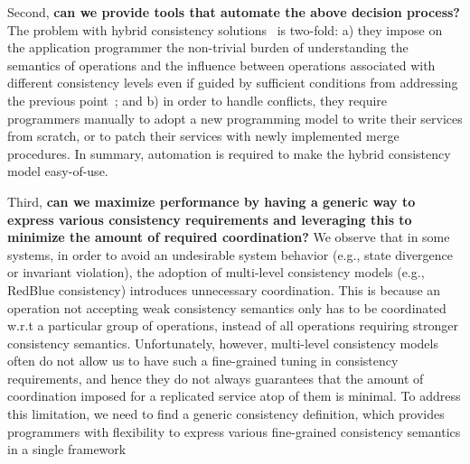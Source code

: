 Second, \textbf{can we provide tools that automate the above 
decision process?} The problem
 with hybrid consistency solutions~\cite{Ladin1992LazyReplication, 
Singh2009Zeno,Li2012RedBlue, Terry2013SLA} is two-fold: a) they impose on the 
application
 programmer the non-trivial burden of understanding the semantics of operations
 and the influence between operations associated with different consistency 
levels even if guided by sufficient conditions from addressing
the previous point~\cite{Li2012RedBlue}; and 
b) in order to handle conflicts, they
 require programmers manually to adopt a new programming model to write their 
services from scratch, or to patch their services with newly implemented merge 
procedures. In summary, automation is required to make the 
hybrid consistency model easy-of-use.

Third, \textbf{can we maximize performance by having a generic way to express
various consistency requirements and leveraging this to minimize
the amount of required coordination?} We observe that
in some systems, in order to avoid an 
undesirable system behavior (e.g., state divergence or invariant violation), 
the adoption of multi-level consistency models (e.g., RedBlue consistency)
introduces unnecessary coordination. This is because an operation not accepting
weak consistency semantics only has to be coordinated w.r.t a particular group of
operations, instead of all operations requiring stronger consistency semantics. Unfortunately,
however, multi-level consistency models often do not allow us to have 
such a fine-grained tuning in consistency requirements, and hence they do not always guarantees 
that the amount of coordination imposed for a replicated service atop of them is minimal. To
address this limitation, we need to find a generic consistency definition, which
provides programmers with flexibility to express various fine-grained consistency semantics in a single
framework

